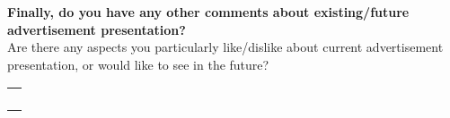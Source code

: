 \textbf{Finally, do you have any other comments about existing/future advertisement presentation?}\\
Are there any aspects you particularly like/dislike about current advertisement presentation, or would like to see in the future?\\
\begin{tabularx}{\linewidth}%
{|>{\centering}X|}

\hline
\tabularnewline
\tabularnewline
\tabularnewline
\tabularnewline
\hline
\end{tabularx}
\\
\\

